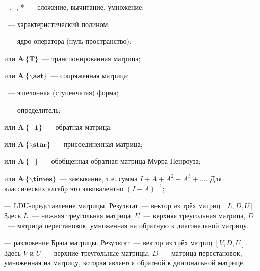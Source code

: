 +, -, *~--- сложение,  вычитание,  умножение; 

~---  характеристический полином;
 
~--- ядро оператора (нуль-пространство);

 или  $\mathbf{A \widehat{\ } \{T\}}$~--- транспонированная матрица;
 
 или  $\mathbf{A\widehat{\ }\{\backslash ast\}}$~--- сопряженная матрица;

~---   эшелонная (ступенчатая) форма; 

~---   определитель;
 
  или  $\mathbf{A\widehat{\ }\{-1\}}$~--- обратная матрица;

  или  $\mathbf{A\widehat{\ }\{\backslash star\}}$~--- присоединенная матрица;
 
 или $\mathbf{A\widehat{\ }\{+\}}$~--- обобщенная обратная матрица Мурра-Пенроуза;
 
  или $\mathbf{A\widehat{\ }\{\backslash times\}}$~--- замыкание,  т.е. сумма $I+A+A^2+A^3+\ldots$. Для классических алгебр это эквивалентно $(I-A)^{-1}$; 

 --- LDU-представление матрицы. Результат~--- вектор из трёх матриц $[L,D,U]$. Здесь $L$~--- нижняя треугольная матрица, $U$~--- верхняя треугольная матрица, 
$D$~--- матрица перестановок, умноженная на обратную к диагональной матрицу.

 --- разложение Брюа матрицы. Результат~--- вектор из трёх матриц $[V,D,U]$. Здесь  $V$ и $U$~--- верхние треугольные матрицы, 
$D$~--- матрица перестановок, умноженная на матрицу, которая является обратной к диагональной матрице.
